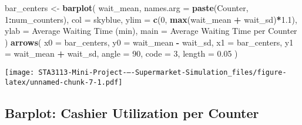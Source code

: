 \documentclass[
]{article}
\newenvironment{Shaded}{\begin{snugshade}}{\end{snugshade}}
\newcommand{\AttributeTok}[1]{\textcolor[rgb]{0.13,0.29,0.53}{#1}}
\newcommand{\DecValTok}[1]{\textcolor[rgb]{0.00,0.00,0.81}{#1}}
\newcommand{\FloatTok}[1]{\textcolor[rgb]{0.00,0.00,0.81}{#1}}
\newcommand{\FunctionTok}[1]{\textcolor[rgb]{0.13,0.29,0.53}{\textbf{#1}}}
\newcommand{\NormalTok}[1]{#1}
\newcommand{\OtherTok}[1]{\textcolor[rgb]{0.56,0.35,0.01}{#1}}
\newcommand{\SpecialCharTok}[1]{\textcolor[rgb]{0.81,0.36,0.00}{\textbf{#1}}}
\newcommand{\StringTok}[1]{\textcolor[rgb]{0.31,0.60,0.02}{#1}}
\begin{document}
\begin{Shaded}
\begin{Highlighting}[]
\NormalTok{bar\_centers }\OtherTok{\textless{}{-}} \FunctionTok{barplot}\NormalTok{(}
\NormalTok{wait\_mean,}
\AttributeTok{names.arg =} \FunctionTok{paste}\NormalTok{(}\StringTok{\textquotesingle{}Counter\textquotesingle{}}\NormalTok{, }\DecValTok{1}\SpecialCharTok{:}\NormalTok{num\_counters),}
\AttributeTok{col =} \StringTok{\textquotesingle{}skyblue\textquotesingle{}}\NormalTok{,}
\AttributeTok{ylim =} \FunctionTok{c}\NormalTok{(}\DecValTok{0}\NormalTok{, }\FunctionTok{max}\NormalTok{(wait\_mean }\SpecialCharTok{+}\NormalTok{ wait\_sd)}\SpecialCharTok{*}\FloatTok{1.1}\NormalTok{),}
\AttributeTok{ylab =} \StringTok{\textquotesingle{}Average Waiting Time (min)\textquotesingle{}}\NormalTok{,}
\AttributeTok{main =} \StringTok{\textquotesingle{}Average Waiting Time per Counter\textquotesingle{}}
\NormalTok{)}
\FunctionTok{arrows}\NormalTok{(}
\AttributeTok{x0 =}\NormalTok{ bar\_centers,}
\AttributeTok{y0 =}\NormalTok{ wait\_mean }\SpecialCharTok{{-}}\NormalTok{ wait\_sd,}
\AttributeTok{x1 =}\NormalTok{ bar\_centers,}
\AttributeTok{y1 =}\NormalTok{ wait\_mean }\SpecialCharTok{+}\NormalTok{ wait\_sd,}
\AttributeTok{angle =} \DecValTok{90}\NormalTok{, }\AttributeTok{code =} \DecValTok{3}\NormalTok{, }\AttributeTok{length =} \FloatTok{0.05}
\NormalTok{)}
\end{Highlighting}
\end{Shaded}

\texttt{[image: STA3113-Mini-Project-–-Supermarket-Simulation\_files/figure-latex/unnamed-chunk-7-1.pdf]}

\newpage
\justifying

\subsection{Barplot: Cashier Utilization per
Counter}\label{barplot-cashier-utilization-per-counter}
\end{document}
